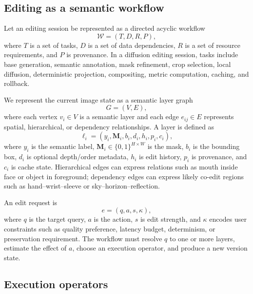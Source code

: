 \documentclass[final,5p,times,number,sort&compress]{elsarticle}
\newcommand{\mask}{\mathbf{M}}
\begin{document}
\subsection{Editing as a semantic workflow}

Let an editing session be represented as a directed acyclic workflow
\begin{equation}
    \mathcal{W} = (T, D, R, P),
\end{equation}
where \(T\) is a set of tasks, \(D\) is a set of data dependencies, \(R\) is a set of resource requirements, and \(P\) is provenance. In a diffusion editing session, tasks include base generation, semantic annotation, mask refinement, crop selection, local diffusion, deterministic projection, compositing, metric computation, caching, and rollback.

We represent the current image state as a semantic layer graph
\begin{equation}
    G = (V,E),
\end{equation}
where each vertex \(v_i \in V\) is a semantic layer and each edge \(e_{ij}\in E\) represents spatial, hierarchical, or dependency relationships. A layer is defined as
\begin{equation}
    \ell_i = (y_i, \mask_i, b_i, d_i, h_i, p_i, c_i),
\end{equation}
where \(y_i\) is the semantic label, \(\mask_i \in \{0,1\}^{H \times W}\) is the mask, \(b_i\) is the bounding box, \(d_i\) is optional depth/order metadata, \(h_i\) is edit history, \(p_i\) is provenance, and \(c_i\) is cache state. Hierarchical edges can express relations such as mouth inside face or object in foreground; dependency edges can express likely co-edit regions such as hand--wrist--sleeve or sky--horizon--reflection.

An edit request is
\begin{equation}
    e = (q, a, s, \kappa),
\end{equation}
where \(q\) is the target query, \(a\) is the action, \(s\) is edit strength, and \(\kappa\) encodes user constraints such as quality preference, latency budget, determinism, or preservation requirement. The workflow must resolve \(q\) to one or more layers, estimate the effect of \(a\), choose an execution operator, and produce a new version state.

\subsection{Execution operators}
\end{document}
